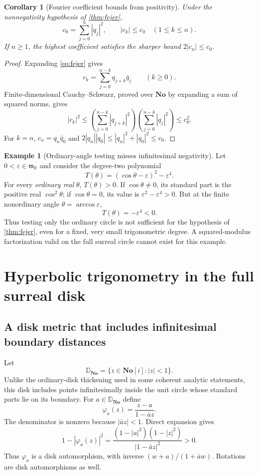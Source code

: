 \documentclass[11pt]{article}
\numberwithin{equation}{section}
\newtheorem{corollary}[theorem]{Corollary}
\theoremstyle{definition}
\newtheorem{example}[theorem]{Example}
\newcommand{\No}{\mathbf{No}}
\newcommand{\SC}{\mathbf{No}[i]}
\newcommand{\R}{\mathbb R}
\newcommand{\mm}{\mathfrak m}
\newcommand{\eps}{\varepsilon}
\begin{document}
\begin{corollary}[Fourier coefficient bounds from positivity]\label{cor:coeffbounds}
Under the nonnegativity hypothesis of \cref{thm:fejer},
\[
 c_0=\sum_{j=0}^n|q_j|^2,\qquad |c_k|\le c_0\quad(1\le k\le n).
\]
If $n\ge1$, the highest coefficient satisfies the sharper bound $2|c_n|\le c_0$.
\end{corollary}
\begin{proof}
Expanding \eqref{eq:fejer} gives
\[
 c_k=\sum_{j=0}^{n-k}q_{j+k}\bar q_j\qquad(k\ge0).
\]
Finite-dimensional Cauchy--Schwarz, proved over $\No$ by expanding a sum of squared norms, gives
\[
 |c_k|^2\le\left(\sum_{j=0}^{n-k}|q_{j+k}|^2\right)
                \left(\sum_{j=0}^{n-k}|q_j|^2\right)\le c_0^2.
\]
For $k=n$, $c_n=q_n\bar q_0$ and
$2|q_n||q_0|\le|q_n|^2+|q_0|^2\le c_0$.
\end{proof}

\begin{example}[Ordinary-angle testing misses infinitesimal negativity]\label{ex:positivity}
Let $0<\eps\in\mm_{\R}$ and consider the degree-two polynomial
\[
 T(\theta)=(\cos\theta-\eps)^2-\eps^4.
\]
For every \emph{ordinary real} $\theta$, $T(\theta)>0$. If $\cos\theta\ne0$, its standard part is the positive real $\cos^2\theta$; if $\cos\theta=0$, its value is $\eps^2-\eps^4>0$. But at the finite nonordinary angle $\theta=\arccos\eps$,
\[
 T(\theta)=-\eps^4<0.
\]
Thus testing only the ordinary circle is not sufficient for the hypothesis of \cref{thm:fejer}, even for a fixed, very small trigonometric degree. A squared-modulus factorization valid on the full surreal circle cannot exist for this example.
\end{example}

\section{Hyperbolic trigonometry in the full surreal disk}\label{sec:hyperbolic}
\subsection{A disk metric that includes infinitesimal boundary distances}
Let
\[
 \mathbb D_{\No}=\{z\in\SC:|z|<1\}.
\]
Unlike the ordinary-disk thickening used in some coherent analytic statements, this disk includes points infinitesimally inside the unit circle whose standard parts lie on its boundary. For $a\in\mathbb D_{\No}$ define
\begin{equation}\label{eq:diskmap}
 \varphi_a(z)=\frac{z-a}{1-\bar a z}.
\end{equation}
The denominator is nonzero because $|\bar a z|<1$. Direct expansion gives
\begin{equation}\label{eq:diskidentity}
 1-|\varphi_a(z)|^2
 =\frac{(1-|a|^2)(1-|z|^2)}{|1-\bar a z|^2}>0.
\end{equation}
Thus $\varphi_a$ is a disk automorphism, with inverse $(w+a)/(1+\bar a w)$. Rotations are disk automorphisms as well.
\end{document}
